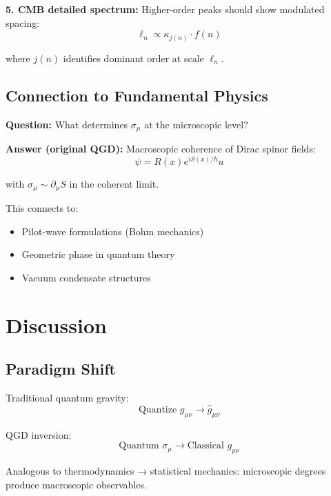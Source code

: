 \documentclass[11pt,a4paper]{article}
\theoremstyle{definition}
\theoremstyle{remark}
\begin{document}
	\textbf{5. CMB detailed spectrum:}
	Higher-order peaks should show modulated spacing:
	\begin{equation}
		\ell_n \propto \kappa_{j(n)} \cdot f(n)
	\end{equation}
	
	where $j(n)$ identifies dominant order at scale $\ell_n$.
	
	\subsection{Connection to Fundamental Physics}
	
	\textbf{Question:} What determines $\sigma_\mu$ at the microscopic level?
	
	\textbf{Answer (original QGD):} Macroscopic coherence of Dirac spinor fields:
	\begin{equation}
		\psi = R(x)e^{iS(x)/\hbar}u
	\end{equation}
	
	with $\sigma_\mu \sim \partial_\mu S$ in the coherent limit.
	
	This connects to:
	\begin{itemize}
		\item Pilot-wave formulations (Bohm mechanics)
		\item Geometric phase in quantum theory
		\item Vacuum condensate structures
	\end{itemize}
	
	\section{Discussion}
	
	\subsection{Paradigm Shift}
	
	Traditional quantum gravity:
	\begin{equation}
		\text{Quantize } g_{\mu\nu} \to \hat{g}_{\mu\nu}
	\end{equation}
	
	QGD inversion:
	\begin{equation}
		\text{Quantum } \sigma_\mu \to \text{Classical } g_{\mu\nu}
	\end{equation}
	
	Analogous to thermodynamics → statistical mechanics: microscopic degrees produce macroscopic observables.
	
\end{document}
